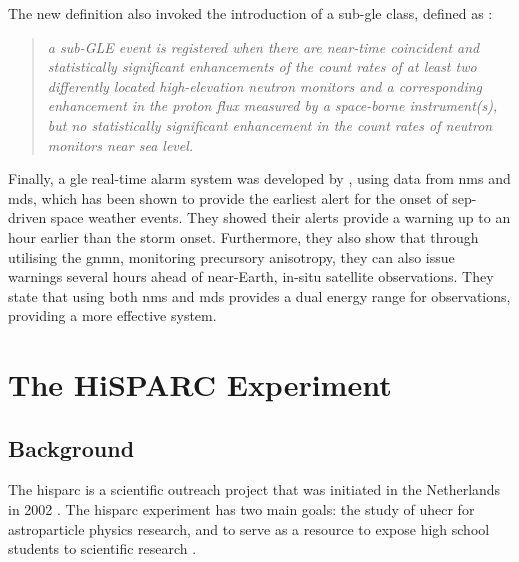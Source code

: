 The new definition also invoked the introduction of a sub-\gls{gle} class, defined as \citep{poluianov_gle_2017}:

\begin{quote}
	\textit{a sub-GLE event is registered when there are near-time coincident and statistically significant enhancements of the count rates of at least two differently located high-elevation neutron monitors and a corresponding enhancement in the proton flux measured by a space-borne instrument(s), but no statistically significant enhancement in the count rates of neutron monitors near sea level.}
\end{quote}


Finally, a \gls{gle} real-time alarm system was developed by \citet{kuwabara_real-time_2006, kuwabara_development_2006}, using data from \glspl{nm} and \glspl{md}, which has been shown to provide the earliest alert for the onset of \gls{sep}-driven space weather events. They showed their alerts provide a warning up to an hour earlier than the storm onset. Furthermore, they also show that through utilising the \gls{gnmn}, monitoring precursory anisotropy, they can also issue warnings several hours ahead of near-Earth, in-situ satellite observations. They state that using both \glspl{nm} and \glspl{md} provides a dual energy range for observations, providing a more effective system.


\section{The HiSPARC Experiment}\label{sec:intro_HiSPARC}

\subsection{Background}

The \gls{hisparc} is a scientific outreach project that was initiated in the Netherlands in 2002 \citep{bartels_hisparc_2012}. The \gls{hisparc} experiment has two main goals: the study of \gls{uhecr} for astroparticle physics research, and to serve as a resource to expose high school students to scientific research \citep{bartels_hisparc_2012}.

